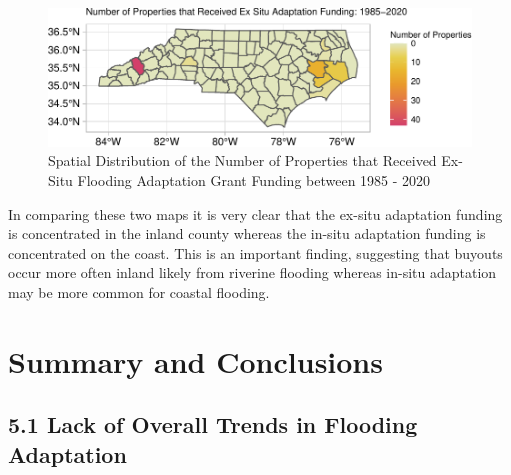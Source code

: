\documentclass[
  12pt,
]{article}
\begin{document}
\begin{figure}
\centering
\includegraphics{finalreport_files/figure-latex/unnamed-chunk-27-1.pdf}
\caption{Spatial Distribution of the Number of Properties that Received
Ex-Situ Flooding Adaptation Grant Funding between 1985 - 2020}
\end{figure}

In comparing these two maps it is very clear that the ex-situ adaptation
funding is concentrated in the inland county whereas the in-situ
adaptation funding is concentrated on the coast. This is an important
finding, suggesting that buyouts occur more often inland likely from
riverine flooding whereas in-situ adaptation may be more common for
coastal flooding.

\newpage

\hypertarget{summary-and-conclusions}{%
\section{Summary and Conclusions}\label{summary-and-conclusions}}

\hypertarget{lack-of-overall-trends-in-flooding-adaptation}{%
\subsection{5.1 Lack of Overall Trends in Flooding
Adaptation}\label{lack-of-overall-trends-in-flooding-adaptation}}
\end{document}
